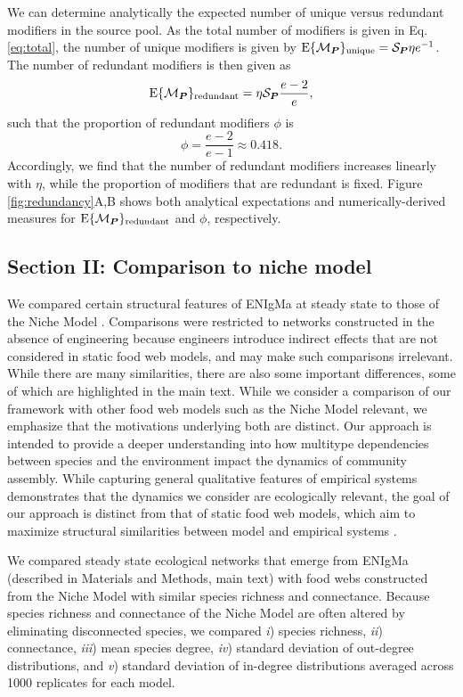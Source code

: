\documentclass[9pt,twocolumn,twoside]{pnas-new}
\newcommand{\rr}[1]{{\rm #1}}
\begin{document}
We can determine analytically the expected number of unique versus redundant modifiers in the source pool.
As the total number of modifiers is given in Eq. \ref{eq:total}, the number of unique modifiers is given by ${\rm E}\{\mathcal{M}_{\bm P}\}_{\rr{unique}} = \mathcal{S}_{\bm P} \eta e^{-1}$.
The number of redundant modifiers is then given as
\begin{equation}
{\rm E}\{\mathcal{M}_{\bm P}\}_{\rr{redundant}} = \eta \mathcal{S}_{\bm P} \frac{e - 2}{e},
\label{eq:redundant}
\end{equation}
such that the proportion of redundant modifiers $\phi$ is
\begin{equation}
\phi = \frac{e-2}{e-1} \approx 0.418.
\label{eq:redundantprop}
\end{equation}
Accordingly, we find that the number of redundant modifiers increases linearly with $\eta$, while the proportion of modifiers that are redundant is fixed.
Figure \ref{fig:redundancy}A,B shows both analytical expectations and numerically-derived measures for ${\rm E}\{\mathcal{M}_{\bm P}\}_{\rr{redundant}}$ and $\phi$, respectively.

\subsection*{Section II: Comparison to niche model}
We compared certain structural features of ENIgMa at steady state to those of the Niche Model \cite{Williams2000}.
Comparisons were restricted to networks constructed in the absence of engineering because engineers introduce indirect effects that are not considered in static food web models, and may make such comparisons irrelevant.
While there are many similarities, there are also some important differences, some of which are highlighted in the main text.
While we consider a comparison of our framework with other food web models such as the Niche Model relevant, we emphasize that the motivations underlying both are distinct.
Our approach is intended to provide a deeper understanding into how multitype dependencies between species and the environment impact the dynamics of community assembly.
While capturing general qualitative features of empirical systems demonstrates that the dynamics we consider are ecologically relevant, the goal of our approach is distinct from that of static food web models, which aim to maximize structural similarities between model and empirical systems \cite{Williams2000,Williams2011}.

We compared steady state ecological networks that emerge from ENIgMa (described in Materials and Methods, main text) with food webs constructed from the Niche Model \cite{Williams2000} with similar species richness and connectance.
Because species richness and connectance of the Niche Model are often altered by eliminating disconnected species, we compared
\emph{i}) species richness,
\emph{ii}) connectance,
\emph{iii}) mean species degree,
\emph{iv}) standard deviation of out-degree distributions, and
\emph{v}) standard deviation of in-degree distributions
averaged across 1000 replicates for each model.
\end{document}

